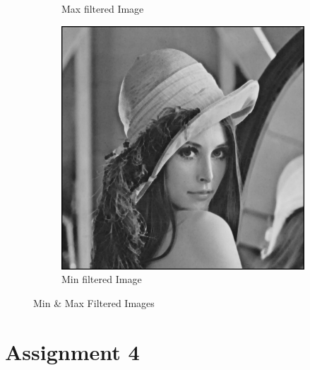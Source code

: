 \documentclass[a4paper,16pt]{article}
\begin{document}
\begin{figure}[h!]
\begin{subfigure}[h!]{0.3\linewidth}
			\caption{Max filtered Image}
		\end{subfigure}
		\hfill
		\begin{subfigure}[h!]{0.3\linewidth}
			\includegraphics[width=\linewidth]{minfilter}
			\caption{Min filtered Image}
		\end{subfigure}%
		\caption{Min \& Max Filtered Images}
	\end{figure}
	\newpage
	\section{Assignment 4}
	\vspace{0.2in}
\end{document}
